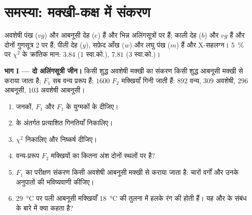 \section{समस्या: मक्खी-कक्ष में संकरण}

\begin{problem}
\label{pb:b2:meiosis-heredity:1}
अवशेषी पंख ($vg$) और आबनूसी देह ($e$)  हैं और भिन्न
अलिंगसूत्रों पर हैं; काली देह ($b$) और $vg$  हैं और दोनों
गुणसूत्र 2 पर हैं; पीली देह ($y$), सफ़ेद आँख ($w$) और लघु पंख
($m$)  हैं और X-सहलग्न। \qty{5}{\%} पर $\chi^2$ के क्रांतिक
मान: $3.84$ (1 स्वा.को.), $7.81$ (3 स्वा.को.)।

\medskip
\noindent\textbf{भाग I --- दो अलिंगसूत्री जीन।}
किसी शुद्ध अवशेषी मक्खी का संकरण किसी शुद्ध आबनूसी मक्खी से कराया जाता
है; $F_1$ सब वन्य प्ररूप हैं; $1600$ $F_2$ मक्खियाँ गिनी जाती हैं:
$892$ वन्य, $309$ अवशेषी, $296$ आबनूसी, $103$ अवशेषी आबनूसी।
\begin{enumerate}
  \item जनकों, $F_1$ और $F_1$ के युग्मकों के  दीजिए।
  \item {} के अंतर्गत प्रत्याशित गिनतियाँ निकालिए।
  \item $\chi^2$ निकालिए और निष्कर्ष दीजिए।
  \item वन्य-प्ररूप $F_2$ मक्खियों का कितना अंश दोनों स्थलों पर
         है?
  \item $F_1$ का परीक्षण संकरण किसी अवशेषी आबनूसी मक्खी से कराया जाता
        है: चारों वर्गों और उनके अनुपातों की भविष्यवाणी कीजिए।
  \item \qty{29}{\celsius} पर पली आबनूसी मक्खियाँ \qty{18}{\celsius}
        की तुलना में हलके रंग की होती हैं। यह  और
         के संबंध के बारे में क्या कहता है?
\end{enumerate}


\end{problem}
